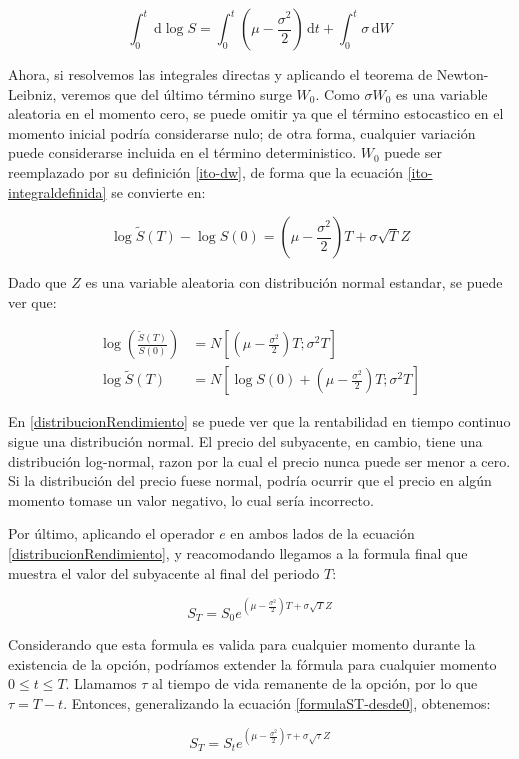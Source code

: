 \begin{equation}
	\int_0^t \,\mathrm{d}\log S = 
		\int_0^t \left(\mu - \frac{\sigma^2}{2}\right) \,\mathrm{d}t +
		\int_0^t \sigma \,\mathrm{d}W \label{ito-integraldefinida}
\end{equation}

Ahora, si resolvemos las integrales directas y aplicando el teorema de Newton-Leibniz, veremos que del último término surge $ W_0 $. Como $ \sigma W_0 $ es una variable aleatoria en el momento cero, se puede omitir ya que el término estocastico en el momento inicial podría considerarse nulo; de otra forma, cualquier variación puede considerarse incluida en el término deterministico. $ W_0 $ puede ser reemplazado por su definición \eqref{ito-dw}, de forma que la ecuación \eqref{ito-integraldefinida} se convierte en:

\begin{equation}
	\log \tilde{S}(T) - \log S(0) = 
		\left(\mu - \frac{\sigma^2}{2}\right) T +
		\sigma \sqrt{T} Z
\end{equation}

Dado que $ Z $ es una variable aleatoria con distribución normal estandar, se puede ver que:

\begin{subequations}
\begin{align}
	\log \left( \frac{\tilde{S}(T)}{S(0)} \right) &= N\left[
		\left(\mu - \frac{\sigma^2}{2}\right) T;
		\sigma^2 T
		\right] \label{distribucionRendimiento}\\
	\log \tilde{S}(T) &= N\left[
		\log S(0) + \left(\mu - \frac{\sigma^2}{2}\right) T;
		\sigma^2 T
		\right] \label{distribucionPrecio}
\end{align}
\end{subequations}

En \eqref{distribucionRendimiento} se puede ver que la rentabilidad en tiempo continuo sigue una distribución normal. El precio del subyacente, en cambio, tiene una distribución log-normal, razon por la cual el precio nunca puede ser menor a cero. Si la distribución del precio fuese normal, podría ocurrir que el precio en algún momento tomase un valor negativo, lo cual sería incorrecto.

Por último, aplicando el operador $e$ en ambos lados de la ecuación \eqref{distribucionRendimiento}, y reacomodando llegamos a la formula final que muestra el valor del subyacente al final del periodo $T$:

\begin{equation}
	S_T = S_0 e^{\left(\mu-\frac{\sigma^2}{2}\right)T+\sigma \sqrt{T} Z} \label{formulaST-desde0}
\end{equation}

Considerando que esta formula es valida para cualquier momento durante la existencia de la opción, podríamos extender la fórmula para cualquier momento $0 \leq t \leq T$. Llamamos $\tau$ al tiempo de vida remanente de la opción, por lo que $\tau=T-t$. Entonces, generalizando la ecuación \eqref{formulaST-desde0}, obtenemos:

\begin{equation}
	S_T = S_t e^{\left(\mu-\frac{\sigma^2}{2}\right)\tau+\sigma \sqrt{\tau} Z} \nonumber
\end{equation}

